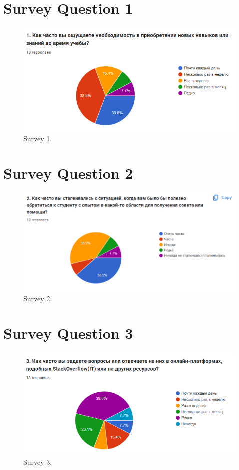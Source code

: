 \section{Survey Question 1}\label{survqa1}
\begin{figure}[H]\label{fig:survey1}
  \centering
  \includegraphics[width=0.8\linewidth]{figures/Survey question 1.png}
  \caption{Survey 1.}
\end{figure}
\section{Survey Question 2}\label{survqa2}
\begin{figure}[H]\label{fig:survey2}
  \centering
  \includegraphics[width=0.8\linewidth]{figures/Survey question 2.png}
  \caption{Survey 2.}
\end{figure}
\section{Survey Question 3}\label{survqa3}
\begin{figure}[H]\label{fig:survey3}
  \centering
  \includegraphics[width=0.8\linewidth]{figures/Survey question 3.png}
  \caption{Survey 3.}
\end{figure}
